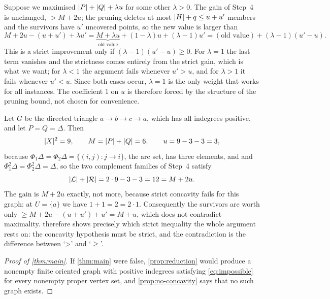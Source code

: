 \begin{remark}\label{rem:lambda}
Suppose we maximised $\lvert P\rvert+\lvert Q\rvert+\lambda u$ for some other $\lambda>0$. The gain of Step~4 is
unchanged, $>M+2u$; the pruning deletes at most $\lvert H\rvert+q\le u+u'$ members and the survivors have
$u'$ uncovered points, so the new value is larger than
\[
 M+2u-(u+u')+\lambda u'=\underbrace{M+\lambda u}_{\text{old value}}+(1-\lambda)u+(\lambda-1)u'
 =(\text{old value})+(\lambda-1)(u'-u).
\]
This is a strict improvement only if $(\lambda-1)(u'-u)\ge0$. For $\lambda=1$ the last term vanishes
and the strictness comes entirely from the strict gain, which is what we want; for $\lambda<1$ the
argument fails whenever $u'>u$, and for $\lambda>1$ it fails whenever $u'<u$. Since both cases occur,
$\lambda=1$ is the only weight that works for all instances. The coefficient $1$ on $u$ is therefore
forced by the structure of the pruning bound, not chosen for convenience.
\end{remark}

\begin{example}\label{ex:triangle}
Let $G$ be the directed triangle $a\to b\to c\to a$, which has all indegrees positive, and let
$P=Q=\Delta$. Then
\[
 \lvert X\rvert^2=9,\qquad M=\lvert P\rvert+\lvert Q\rvert=6,\qquad u=9-3-3=3,
\]
because $\Phi_1\Delta=\Phi_2\Delta=\{(i,j):j\to i\}$, the arc set, has three elements, and
and $\Phi_1^2\Delta=\Phi_2^2\Delta=\Delta$, so the two complement families of Step~4 satisfy
\[
 \lvert \mathcal L\rvert+\lvert \mathcal R\rvert=2\cdot9-3-3=12=M+2u .
\]
The gain is $M+2u$ exactly, not more, because strict concavity fails for this graph: at $U=\{a\}$ we
have $1+1=2=2\cdot1$. Consequently the survivors are worth only
$\ge M+2u-(u+u')+u'=M+u$, which does not contradict maximality.  therefore shows
precisely which strict inequality the whole argument rests on: the concavity hypothesis must be
strict, and the contradiction is the difference between `>' and `$\ge$'.
\end{example}

\begin{proof}[Proof of \cref{thm:main}]
If \cref{thm:main} were false, \cref{prop:reduction} would produce a nonempty finite oriented graph
with positive indegrees satisfying \eqref{eq:impossible} for every nonempty proper vertex set, and
\cref{prop:no-concavity} says that no such graph exists.
\end{proof}

